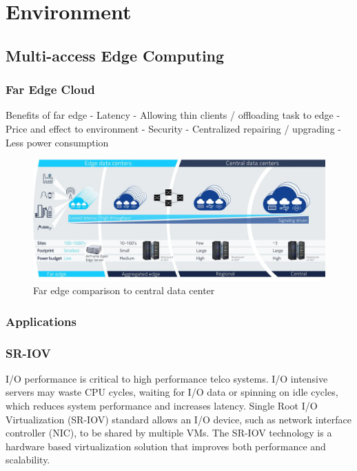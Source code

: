 \chapter{Environment}
\label{chapter:environment}

\section{Multi-access Edge Computing}

\subsection{Far Edge Cloud}



Benefits of far edge
    - Latency
    - Allowing thin clients / offloading task to edge
    - Price and effect to environment
    - Security
    - Centralized repairing / upgrading
    - Less power consumption
    

\begin{figure}[ht]
  \begin{center}
    \includegraphics[width=13.5cm]{LaTeX/images/AirFrameOpenEdgeServer.png}
    \caption{Far edge comparison to central data center \cite{AirFrameOpenEdgeServer}}
    \label{fig:AirFrameOpenEdgeServer}
  \end{center}
\end{figure}

\subsection{Applications}


\subsection{SR-IOV}
\label{section:SR-IOV}

I/O performance is critical to high performance telco systems. I/O intensive servers may waste CPU cycles, waiting for I/O data or spinning on idle cycles, which reduces system performance and increases latency. Single Root I/O Virtualization (SR-IOV) standard allows an I/O device, such as network interface controller (NIC), to be shared by multiple VMs. The SR-IOV technology is a hardware based virtualization solution that improves both performance and scalability. \cite{Dong2012}

